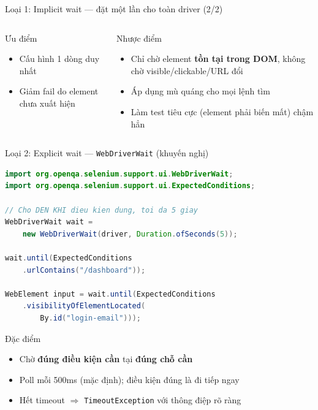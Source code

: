 \documentclass[aspectratio=169,12pt]{beamer}
\begin{document}
\begin{frame}{Loại 1: Implicit wait --- đặt một lần cho toàn driver (2/2)}
  \begin{columns}[T]
    \begin{exampleblock}{Ưu điểm}
      \begin{itemize}
        \item Cấu hình 1 dòng duy nhất
        \item Giảm fail do element chưa xuất hiện
      \end{itemize}
    \end{exampleblock}
    \begin{alertblock}{Nhược điểm}
      \begin{itemize}
        \item Chỉ chờ element \textbf{tồn tại trong DOM},
              không chờ visible/clickable/URL đổi
        \item Áp dụng mù quáng cho mọi lệnh tìm
        \item Làm test tiêu cực (element phải biến mất) chậm hẳn
      \end{itemize}
    \end{alertblock}
  \end{columns}
\end{frame}

\begin{frame}[fragile]{Loại 2: Explicit wait --- \texttt{WebDriverWait} (khuyến nghị)}
\begin{lstlisting}[language=Java,basicstyle=\ttfamily\scriptsize]
import org.openqa.selenium.support.ui.WebDriverWait;
import org.openqa.selenium.support.ui.ExpectedConditions;

// Cho DEN KHI dieu kien dung, toi da 5 giay
WebDriverWait wait =
    new WebDriverWait(driver, Duration.ofSeconds(5));

wait.until(ExpectedConditions
    .urlContains("/dashboard"));

WebElement input = wait.until(ExpectedConditions
    .visibilityOfElementLocated(
        By.id("login-email")));
\end{lstlisting}

  \begin{block}{Đặc điểm}
    \begin{itemize}
      \item Chờ \textbf{đúng điều kiện cần} tại \textbf{đúng chỗ cần}
      \item Poll mỗi 500ms (mặc định); điều kiện đúng là đi tiếp ngay
      \item Hết timeout $\Rightarrow$ \texttt{TimeoutException} với
            thông điệp rõ ràng
    \end{itemize}
  \end{block}
\end{frame}
\end{document}
